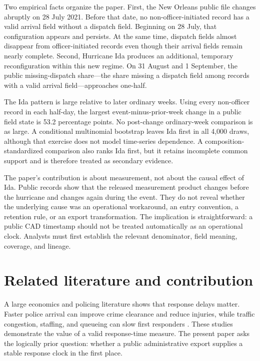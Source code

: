 \documentclass[11pt]{article}
\begin{document}
Two empirical facts organize the paper. First, the New Orleans public file changes abruptly on 28 July 2021. Before that date, no non-officer-initiated record has a valid arrival field without a dispatch field. Beginning on 28 July, that configuration appears and persists. At the same time, dispatch fields almost disappear from officer-initiated records even though their arrival fields remain nearly complete. Second, Hurricane Ida produces an additional, temporary reconfiguration within this new regime. On 31 August and 1 September, the public missing-dispatch share---the share missing a dispatch field among records with a valid arrival field---approaches one-half.

The Ida pattern is large relative to later ordinary weeks. Using every non-officer record in each half-day, the largest event-minus-prior-week change in a public field state is 53.2 percentage points. No post-change ordinary-week comparison is as large. A conditional multinomial bootstrap leaves Ida first in all 4,000 draws, although that exercise does not model time-series dependence. A composition-standardized comparison also ranks Ida first, but it retains incomplete common support and is therefore treated as secondary evidence.

The paper's contribution is about measurement, not about the causal effect of Ida. Public records show that the released measurement product changes before the hurricane and changes again during the event. They do not reveal whether the underlying cause was an operational workaround, an entry convention, a retention rule, or an export transformation. The implication is straightforward: a public CAD timestamp should not be treated automatically as an operational clock. Analysts must first establish the relevant denominator, field meaning, coverage, and lineage.

\section{Related literature and contribution}

A large economics and policing literature shows that response delays matter. Faster police arrival can improve crime clearance and reduce injuries, while traffic congestion, staffing, and queueing can slow first responders \citep{BlanesKirchmaier2018,DeAngeloTogerWeisburd2023,BrentBeland2020,MourtgosAdamsNix2024}. These studies demonstrate the value of a valid response-time measure. The present paper asks the logically prior question: whether a public administrative export supplies a stable response clock in the first place.
\end{document}
